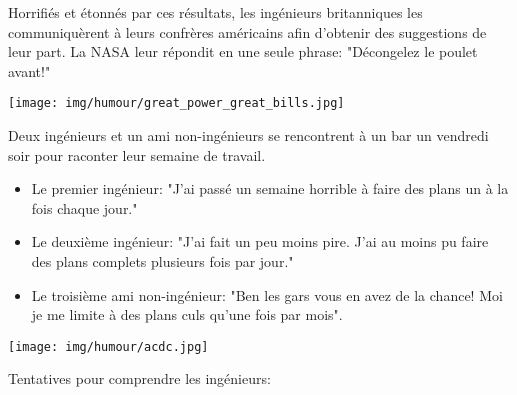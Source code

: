 	Horrifiés et étonnés par ces résultats, les ingénieurs britanniques les communiquèrent  à leurs confrères américains afin d'obtenir des suggestions de leur part. La NASA leur répondit en une seule phrase: "Décongelez le poulet avant!"

	\begin{center}\underline{\hspace{5 cm}}\end{center}
	
	\begin{center}
	\texttt{[image: img/humour/great\_power\_great\_bills.jpg]}
	\end{center}

	\begin{center}\underline{\hspace{5 cm}}\end{center}

Deux ingénieurs et un ami non-ingénieurs se rencontrent à un bar un vendredi soir pour raconter leur semaine de travail.

	\begin{itemize}
		\item Le premier ingénieur: "J'ai passé un semaine horrible à faire des plans un à la fois chaque jour."
	
		\item Le deuxième ingénieur: "J'ai fait un peu moins pire. J'ai au moins pu faire des plans complets plusieurs fois par jour."
	
		\item Le troisième ami non-ingénieur: "Ben les gars vous en avez de la chance! Moi je me limite à des plans culs qu'une fois par mois".
	\end{itemize}
	\begin{center}\underline{\hspace{5 cm}}\end{center}

	\begin{center}
	\texttt{[image: img/humour/acdc.jpg]}
	\end{center}

	\begin{center}\underline{\hspace{5 cm}}\end{center}

Tentatives pour comprendre les ingénieurs:

